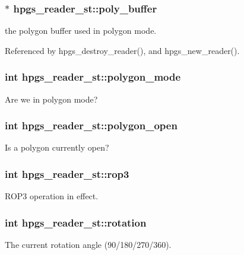 \subsubsection[{poly\_\-buffer}]{$\ast$ {\bf hpgs\_\-reader\_\-st::poly\_\-buffer}}\label{structhpgs__reader__st_ae71fdd01d1e62cf0893692acf6796920}
the polygon buffer used in polygon mode. 

Referenced by hpgs\_\-destroy\_\-reader(), and hpgs\_\-new\_\-reader().

\subsubsection[{polygon\_\-mode}]{\setlength{\rightskip}{0pt plus 5cm}int {\bf hpgs\_\-reader\_\-st::polygon\_\-mode}}\label{structhpgs__reader__st_ac6f5ffb0799120c579073a10f8dda99d}
Are we in polygon mode? 
\subsubsection[{polygon\_\-open}]{\setlength{\rightskip}{0pt plus 5cm}int {\bf hpgs\_\-reader\_\-st::polygon\_\-open}}\label{structhpgs__reader__st_ab84b4fe7de340a06ba16d07b9a1f7387}
Is a polygon currently open? 
\subsubsection[{rop3}]{\setlength{\rightskip}{0pt plus 5cm}int {\bf hpgs\_\-reader\_\-st::rop3}}\label{structhpgs__reader__st_a3bdfe505341184cf0d69c7cde6d19d49}
ROP3 operation in effect. 
\subsubsection[{rotation}]{\setlength{\rightskip}{0pt plus 5cm}int {\bf hpgs\_\-reader\_\-st::rotation}}\label{structhpgs__reader__st_a8573cfba08ff02a7f2ff3b8bd290b291}
The current rotation angle (90/180/270/360). 
